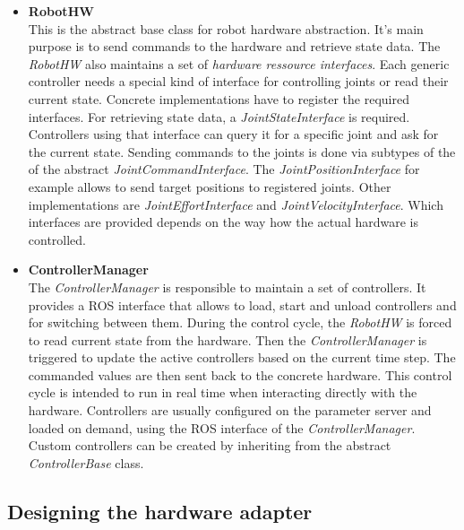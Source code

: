\begin{itemize}

\item \textbf{RobotHW} \\

This is the abstract base class for robot hardware abstraction. It's main purpose is to send commands to the hardware and retrieve state data. The \emph{RobotHW} also maintains a set of \emph{hardware ressource interfaces}. Each generic controller needs a special kind of interface for controlling joints or read their current state. Concrete implementations have to register the required interfaces. For retrieving state data, a \emph{JointStateInterface} is required. Controllers using that interface can query it for a specific joint and ask for the current state. Sending commands to the joints is done via subtypes of the of the abstract \emph{JointCommandInterface}. The \emph{JointPositionInterface} for example allows to send target positions to registered joints. Other implementations are \emph{JointEffortInterface} and \emph{JointVelocityInterface}. Which interfaces are provided depends on the way how the actual hardware is controlled.

\item \textbf{ControllerManager} \\

The \emph{ControllerManager} is responsible to maintain a set of controllers. It provides a ROS interface that allows to load, start and unload controllers and for switching between them. During the control cycle, the \emph{RobotHW} is forced to read current state from the hardware. Then the \emph{ControllerManager} is triggered to update the active controllers based on the current time step. The commanded values are then sent back to the concrete hardware. This control cycle is intended to run in real time when interacting directly with the hardware. Controllers are usually configured on the parameter server and loaded on demand, using the ROS interface of the \emph{ControllerManager}. Custom controllers can be created by inheriting from the abstract  \emph{ControllerBase} class.  

\end{itemize}

\subsection{Designing the hardware adapter}

